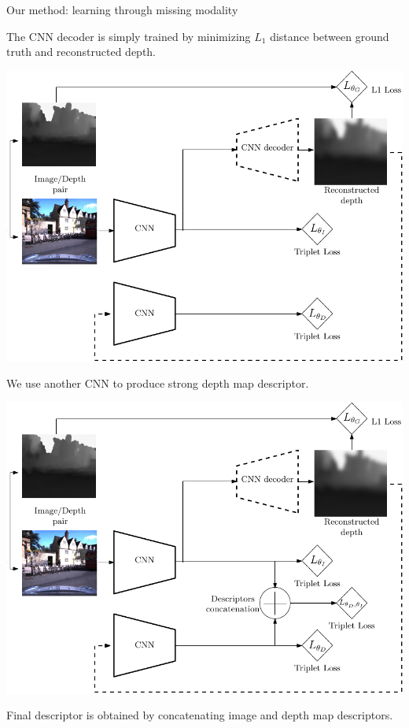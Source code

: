 \begin{frame}{Our method: learning through missing modality}
{\begin{minipage}{0.3\linewidth}
		The CNN decoder is simply trained by minimizing $L_{1}$ distance between ground truth and reconstructed depth.
	\end{minipage}		
	
	}
	{
	\begin{minipage}{0.6\linewidth}
		\centering
		\includegraphics[width=\linewidth]{vect/method/fig3/3}	
	\end{minipage}\hfill
	\begin{minipage}{0.3\linewidth}
		\raggedright
		We use another CNN to produce strong depth map descriptor.
	\end{minipage}			
	
	}
	{
	\begin{minipage}{0.6\linewidth}
		\centering
		\includegraphics[width=\linewidth]{vect/method/fig3/4}	
	\end{minipage}\hfill
	\begin{minipage}{0.3\linewidth}
		\raggedright
		Final descriptor is obtained by concatenating image and depth map descriptors.
	\end{minipage}			
	
	}
\end{frame}

